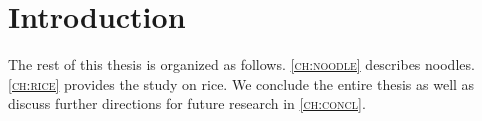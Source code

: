 \chapter{Introduction}
\label{ch:intro}

\lipsum[1]

The rest of this thesis is organized as follows.
\textsc{\autoref{ch:noodle}} describes noodles. 
\textsc{\autoref{ch:rice}} provides the study on rice. 
We conclude the entire thesis as well as discuss further directions for future research in \textsc{\autoref{ch:concl}}.